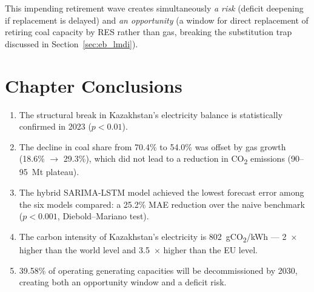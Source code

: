 This impending retirement wave creates simultaneously \emph{a risk} (deficit deepening if replacement is delayed) and \emph{an opportunity} (a window for direct replacement of retiring coal capacity by RES rather than gas, breaking the substitution trap discussed in Section~\ref{sec:eb_lmdi}).

\section{Chapter Conclusions}
\label{sec:eb_conclusions}

\begin{enumerate}
    \item The structural break in Kazakhstan's electricity balance is statistically confirmed in 2023 ($p < 0.01$).
    \item The decline in coal share from 70.4\% to 54.0\% was offset by gas growth (18.6\% $\to$ 29.3\%), which did not lead to a reduction in CO\textsubscript{2} emissions (90--95~Mt plateau).
    \item The hybrid SARIMA-LSTM model achieved the lowest forecast error among the six models compared: a 25.2\% MAE reduction over the naive benchmark ($p < 0.001$, Diebold--Mariano test).
    \item The carbon intensity of Kazakhstan's electricity is 802~gCO\textsubscript{2}/kWh --- 2~$\times$ higher than the world level and 3.5~$\times$ higher than the EU level.
    \item 39.58\% of operating generating capacities will be decommissioned by 2030, creating both an opportunity window and a deficit risk.
\end{enumerate}
